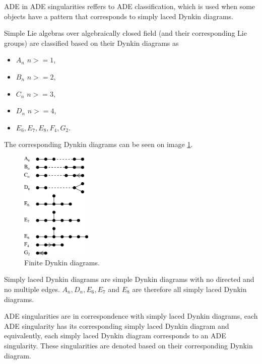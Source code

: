 ADE in ADE singularities reffers to ADE classification, which is used when
some objects have a pattern that corresponds to simply laced Dynkin diagrams.

Simple Lie algebras over algebraically closed field 
(and their corresponding Lie groups) are
classified based on their Dynkin diagrams as
\begin{itemize}
\item $A_n$ \hspace{3mm}  $n>=1$,
\item $B_n$ \hspace{3mm}  $n>=2$,
\item $C_n$ \hspace{3mm}  $n>=3$,
\item $D_n$ \hspace{3mm}  $n>=4$,
\item $E_6, E_7, E_8, F_4, G_2$.
\end{itemize}
The corresponding Dynkin diagrams can be seen on image \ref{img:3}.

\begin{figure}
    \centerline{\includegraphics[width=0.3\textwidth]{images/img3}}
    \caption[Finite Dynkin diagrams]
    {Finite Dynkin diagrams\cite{wikidynkindiagram}.}
    \label{img:3}
\end{figure}

Simply laced Dynkin diagrams are simple Dynkin diagrams with no directed
and no multiple edges. $A_n, D_n, E_6, E_7$ and $E_8$ are therefore all
simply laced Dynkin diagrams.

ADE singularities are in correspondence with simply laced Dynkin
diagrams, each ADE singularity has its corresponding simply laced Dynkin
diagram and equivalently, each simply laced Dynkin diagram corresponds
to an ADE singularity. These singularities are denoted based on their
corresponding Dynkin diagram.

